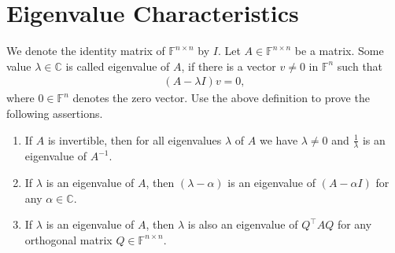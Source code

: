 \section{Eigenvalue Characteristics}
We denote the identity matrix of $\mathbb{F}^{n \times n}$ by $I$. Let $A \in \mathbb{F}^{n\times n}$ be a matrix. Some value $\lambda \in \mathbb{C}$ 
is called eigenvalue of $A$, if there is a vector $v \neq {0}$ in $\mathbb{F}^{n}$ such that
\begin{align*}
(A - \lambda I)v = {0},
\end{align*}  
where ${0} \in \mathbb{F}^{n}$ denotes the zero vector. Use the above definition to prove the following assertions.
\begin{enumerate}
	\item If $A$ is invertible, then for all eigenvalues $\lambda$ of $A$ we have $\lambda \neq 0$ and $\frac{1}{\lambda}$ is an eigenvalue of $A^{-1}$.
	\item If $\lambda$ is an eigenvalue of $A$, then $(\lambda - \alpha)$ is an eigenvalue of $(A - \alpha I)$ for any $\alpha \in \mathbb{C}$.
	\item If $\lambda$ is an eigenvalue of $A$, then $\lambda$ is also an eigenvalue of $Q^\top A Q$ for any orthogonal matrix $Q \in \mathbb{F}^{n \times n}$.
\end{enumerate}